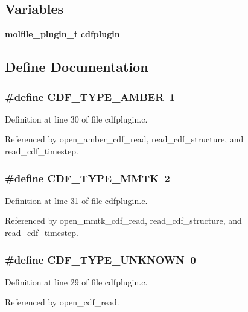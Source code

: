 \subsection*{Variables}
\begin{CompactItemize}
\item 
{\bf molfile\_\-plugin\_\-t} {\bf cdfplugin}
\end{CompactItemize}


\subsection{Define Documentation}
\subsubsection{\setlength{\rightskip}{0pt plus 5cm}\#define CDF\_\-TYPE\_\-AMBER\ 1}\label{cdfplugin_8c_a1}




Definition at line 30 of file cdfplugin.c.

Referenced by open\_\-amber\_\-cdf\_\-read, read\_\-cdf\_\-structure, and read\_\-cdf\_\-timestep.
\subsubsection{\setlength{\rightskip}{0pt plus 5cm}\#define CDF\_\-TYPE\_\-MMTK\ 2}\label{cdfplugin_8c_a2}




Definition at line 31 of file cdfplugin.c.

Referenced by open\_\-mmtk\_\-cdf\_\-read, read\_\-cdf\_\-structure, and read\_\-cdf\_\-timestep.
\subsubsection{\setlength{\rightskip}{0pt plus 5cm}\#define CDF\_\-TYPE\_\-UNKNOWN\ 0}\label{cdfplugin_8c_a0}




Definition at line 29 of file cdfplugin.c.

Referenced by open\_\-cdf\_\-read.

